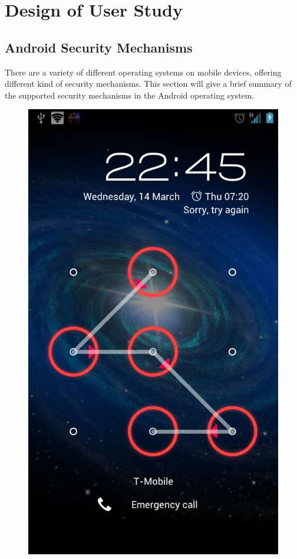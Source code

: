 \chapter{Design of User Study}
  
  \clearpage
  \section{Android Security Mechanisms}

    There are a variety of different operating systems on mobile devices, offering different kind of security mechanisms. This section will give a brief summary of the supported security mechanisms in the Android operating system.

    \begin{figure}
      \vspace{-20pt}
      \begin{center}
        \includegraphics[scale=0.15]{pics/patternLock.png}

\end{center}
\end{figure}
